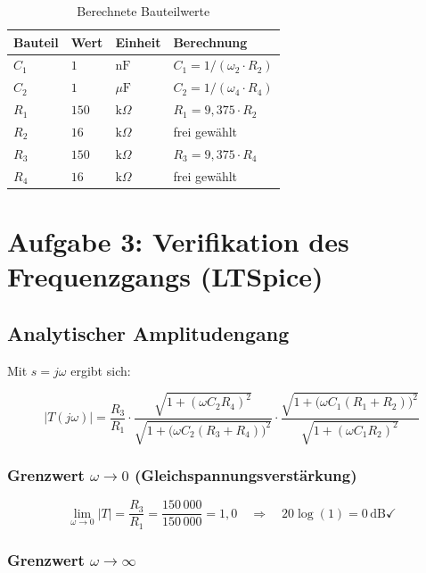 \documentclass[12pt,a4paper]{article}
\begin{document}
\begin{table}[H]
  \centering
  \caption{Berechnete Bauteilwerte}
  \begin{tabular}{llll}
    \toprule
    Bauteil & Wert & Einheit & Berechnung \\
    \midrule
    $C_1$ & $1$   & $\text{nF}$   & $C_1 = 1/(\omega_2 \cdot R_2)$ \\
    $C_2$ & $1$   & $\mu\text{F}$ & $C_2 = 1/(\omega_4 \cdot R_4)$ \\
    $R_1$ & $150$ & $\text{k}\Omega$ & $R_1 = 9{,}375\cdot R_2$ \\
    $R_2$ & $16$  & $\text{k}\Omega$ & frei gewählt \\
    $R_3$ & $150$ & $\text{k}\Omega$ & $R_3 = 9{,}375\cdot R_4$ \\
    $R_4$ & $16$  & $\text{k}\Omega$ & frei gewählt \\
    \bottomrule
  \end{tabular}
\end{table}

\section{Aufgabe 3: Verifikation des Frequenzgangs (LTSpice)}

\subsection{Analytischer Amplitudengang}

Mit $s = j\omega$ ergibt sich:

\[
  |T(j\omega)| = \frac{R_3}{R_1}
                 \cdot \frac{\sqrt{1 + (\omega C_2 R_4)^2}}
                            {\sqrt{1 + \bigl(\omega C_2(R_3+R_4)\bigr)^2}}
                 \cdot \frac{\sqrt{1 + \bigl(\omega C_1(R_1+R_2)\bigr)^2}}
                            {\sqrt{1 + (\omega C_1 R_2)^2}}
\]

\subsubsection*{Grenzwert $\omega \to 0$ (Gleichspannungsverstärkung)}

\[
  \lim_{\omega \to 0}|T|
  = \frac{R_3}{R_1}
  = \frac{150\,000}{150\,000}
  = 1{,}0
  \quad \Rightarrow \quad
  20\log(1) = 0\,\text{dB} \checkmark
\]

\subsubsection*{Grenzwert $\omega \to \infty$}
\end{document}
